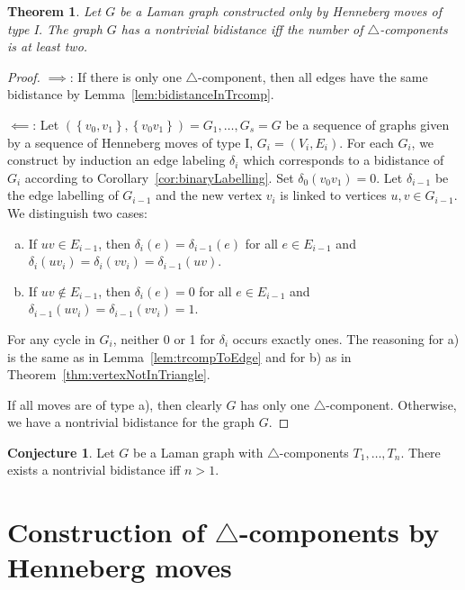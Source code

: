 \documentclass[a4paper, 11pt]{article}
\newcommand{\trcomp}{$\triangle$-component}
\newcommand{\trcomps}{$\triangle$-components}
\newtheorem{thm}{Theorem}[section]
\theoremstyle{definition}
\newtheorem{conj}{Conjecture}
\begin{document}
\begin{thm}
Let $G$ be a Laman graph constructed only by Henneberg moves of type I. The graph $G$ has a nontrivial bidistance iff the number of \trcomps{} is at least two.
\end{thm}
\begin{proof}
$\implies$: If there is only one \trcomp{}, then all edges have the same bidistance by Lemma~\ref{lem:bidistanceInTrcomp}.

$\impliedby$:
Let $(\left\{v_0,v_1\right\}, \left\{v_0v_1\right\})= G_1, \dots, G_s=G$ be a sequence of graphs given by a sequence of Henneberg moves of type I, $G_i=(V_i,E_i)$. For each $G_i$, we construct by induction an edge labeling $\delta_i$ which corresponds to a bidistance of $G_i$ according to Corollary~\ref{cor:binaryLabelling}. Set $\delta_0(v_0v_1)=0$. Let $\delta_{i-1}$ be the edge labelling of $G_{i-1}$ and the new vertex $v_i$ is linked to vertices $u,v \in G_{i-1}$.
We distinguish two cases:
\begin{enumerate}[a)]
	\item If $uv\in E_{i-1}$, then $\delta_i(e)=\delta_{i-1}(e)$ for all $e \in E_{i-1}$ and $\delta_{i}(uv_i)=\delta_{i}(vv_i)=\delta_{i-1}(uv)$.
	\item If $uv\notin E_{i-1}$, then $\delta_i(e)=0$ for all $e \in E_{i-1}$ and $\delta_{i-1}(uv_i)=\delta_{i-1}(vv_i)=1$.
\end{enumerate}
For any cycle in $G_i$, neither 0 or 1 for $\delta_i$ occurs exactly ones. The reasoning for a) is the same as in Lemma~\ref{lem:trcompToEdge} and for b) as in Theorem~\ref{thm:vertexNotInTriangle}.

If all moves are of type a), then clearly $G$ has only one \trcomp{}. Otherwise, we have a nontrivial bidistance for the graph $G$.
\end{proof}


\begin{conj}
Let $G$ be a Laman graph with \trcomps{} $T_1,\dots, T_n$. There exists a nontrivial bidistance iff $n>1$.
\end{conj}


\section{Construction of \trcomps{} by Henneberg moves}
\end{document}
